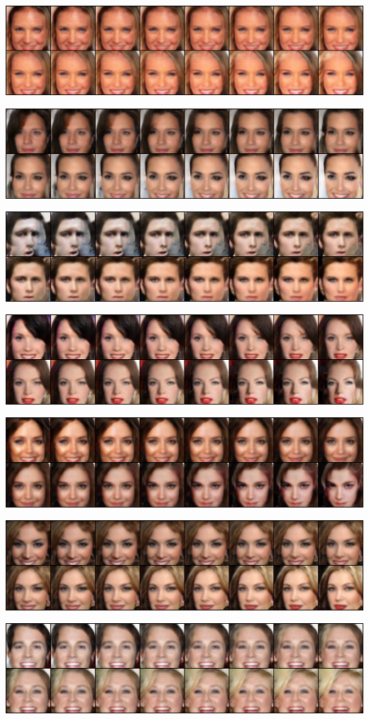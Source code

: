 \documentclass[12pt, a4paper]{article}
\begin{document}
\centerline{\includegraphics[width=0.9\paperwidth]{inter115.png}}
\centerline{\includegraphics[width=0.9\paperwidth]{inter127.png}}
\centerline{\includegraphics[width=0.9\paperwidth]{inter232.png}}
\centerline{\includegraphics[width=0.9\paperwidth]{inter292.png}}
\centerline{\includegraphics[width=0.9\paperwidth]{inter341.png}}
\centerline{\includegraphics[width=0.9\paperwidth]{inter443.png}}
\centerline{\includegraphics[width=0.9\paperwidth]{inter486.png}}
\end{document}
